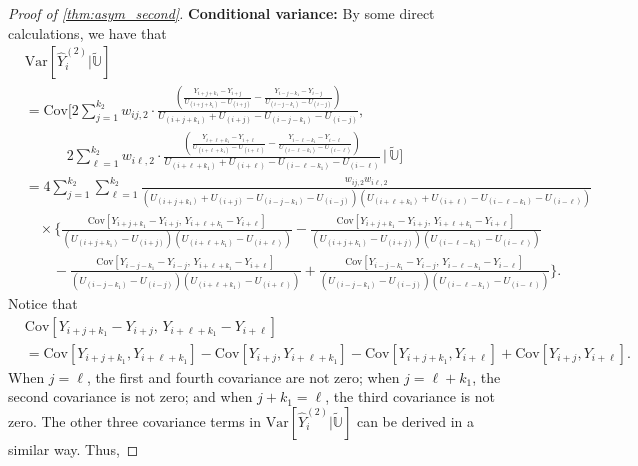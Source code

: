 \documentclass{uwstat572}
\theoremstyle{definition}
\renewcommand{\hat}{\widehat}
\renewcommand{\tilde}{\widetilde}
\theoremstyle{theorem}
\begin{document}
\begin{proof}[Proof of \autoref{thm:asym_second}]
{\bf Conditional variance:} By some direct calculations, we have that
\begin{align*}
&\mathrm{Var}\left[\hat{Y}_i^{(2)} \big| \tilde{\mathbb{U}}\right] \\
&= \mathrm{Cov}\Bigg[2\sum_{j=1}^{k_2} w_{ij,2} \cdot \frac{\left(\frac{Y_{i+j+k_1} -Y_{i+j}}{U_{(i+j+k_1)} - U_{(i+j)}} - \frac{Y_{i-j-k_1} -Y_{i-j}}{U_{(i-j-k_1)} - U_{(i-j)}} \right)}{U_{(i+j+k_1)} + U_{(i+j)} - U_{(i-j-k_1)} -U_{(i-j)}},\,\\
&\quad\quad\quad 2\sum_{\ell=1}^{k_2} w_{i\ell,2} \cdot \frac{\left(\frac{Y_{i+\ell+k_1} -Y_{i+\ell}}{U_{(i+\ell+k_1)} - U_{(i+\ell)}} - \frac{Y_{i-\ell-k_1} -Y_{i-\ell}}{U_{(i-\ell-k_1)} - U_{(i-\ell)}} \right)}{U_{(i+\ell+k_1)} + U_{(i+\ell)} - U_{(i-\ell-k_1)} -U_{(i-\ell)}}\,\Bigg|\, \tilde{\mathbb{U}}\Bigg]\\
&= 4\sum_{j=1}^{k_2} \sum_{\ell=1}^{k_2} \frac{w_{ij,2}w_{i\ell,2}}{\left(U_{(i+j+k_1)} + U_{(i+j)} - U_{(i-j-k_1)} -U_{(i-j)}\right) \left(U_{(i+\ell+k_1)} + U_{(i+\ell)} - U_{(i-\ell-k_1)} -U_{(i-\ell)} \right)}\\
&\quad\times \Bigg\{\frac{\mathrm{Cov}\left[Y_{i+j+k_1} -Y_{i+j},\, Y_{i+\ell+k_1}-Y_{i+\ell}\right]}{\left(U_{(i+j+k_1)} -U_{(i+j)}\right)\left(U_{(i+\ell+k_1)} - U_{(i+\ell)}\right)} - \frac{\mathrm{Cov}\left[Y_{i+j+k_1} -Y_{i+j},\, Y_{i+\ell+k_1}-Y_{i+\ell}\right]}{\left(U_{(i+j+k_1)} -U_{(i+j)}\right)\left(U_{(i-\ell-k_1)} - U_{(i-\ell)}\right)} \\
&\quad\quad- \frac{\mathrm{Cov}\left[Y_{i-j-k_1} -Y_{i-j},\, Y_{i+\ell+k_1}-Y_{i+\ell}\right]}{\left(U_{(i-j-k_1)} -U_{(i-j)}\right)\left(U_{(i+\ell+k_1)} - U_{(i+\ell)}\right)} + \frac{\mathrm{Cov}\left[Y_{i-j-k_1} -Y_{i-j},\, Y_{i-\ell-k_1}-Y_{i-\ell}\right]}{\left(U_{(i-j-k_1)} -U_{(i-j)}\right)\left(U_{(i-\ell-k_1)} - U_{(i-\ell)}\right)}\Bigg\}.
\end{align*}
Notice that 
\begin{align*}
&\mathrm{Cov}\left[Y_{i+j+k_1} -Y_{i+j},\, Y_{i+\ell+k_1}-Y_{i+\ell}\right]\\
&=\mathrm{Cov}\left[Y_{i+j+k_1}, Y_{i+\ell +k_1}\right] - \mathrm{Cov}\left[Y_{i+j}, Y_{i+\ell+k_1}\right] - \mathrm{Cov}\left[Y_{i+j+k_1}, Y_{i+\ell}\right]+ \mathrm{Cov}\left[Y_{i+j}, Y_{i+\ell}\right].
\end{align*}
When $j=\ell$, the first and fourth covariance are not zero; when $j=\ell+k_1$, the second covariance is not zero; and when $j+k_1=\ell$, the third covariance is not zero. The other three covariance terms in $\mathrm{Var}\left[\hat{Y}_i^{(2)} \big| \tilde{\mathbb{U}}\right]$ can be derived in a similar way. Thus,

\end{proof}
\end{document}
